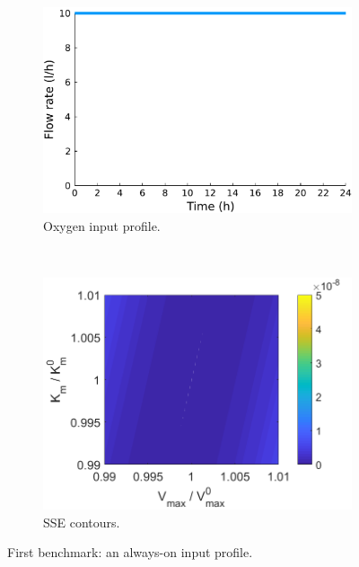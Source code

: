 \begin{figure}[H]
	\centering
	\begin{subfigure}[b]{0.45\textwidth}
		\includegraphics[width=\textwidth]{figure/paper 1/extra2}
		\caption{Oxygen input profile.}
		\label{inputcompare2}
	\end{subfigure}
	~ %
	\begin{subfigure}[b]{0.45\textwidth}
		\includegraphics[width=\textwidth]{figure/paper 1/compare2.png}
		\caption{SSE contours.}
		\label{SSEcompare2}
	\end{subfigure}
	\caption{First benchmark: an always-on input profile.}
	\label{compare2}
\end{figure}
